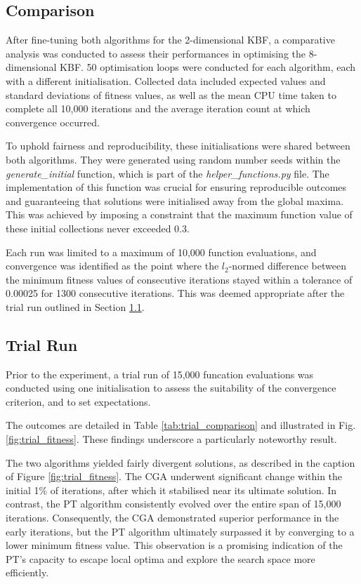 \documentclass[10pt]{article}
\begin{document}
\begin{multicols}{2}
\section{Comparison}
\label{sec:CGA_QEG_comparison}

After fine-tuning both algorithms for the 2-dimensional KBF, a comparative analysis was conducted to assess their performances in optimising the 8-dimensional KBF. 50 optimisation loops were conducted for each algorithm, each with a different initialisation.  Collected data included expected values and standard deviations of fitness values, as well as the mean CPU time taken to complete all 10,000 iterations and the average iteration count at which convergence occurred.

To uphold fairness and reproducibility, these initialisations were shared between both algorithms. They were generated using random number seeds within the \textit{generate\_initial} function, which is part of the \textit{helper\_functions.py} file. The implementation of this function was crucial for ensuring reproducible outcomes and guaranteeing that solutions were initialised away from the global maxima. This was achieved by imposing a constraint that the maximum function value of these initial collections never exceeded 0.3.

Each run was limited to a maximum of 10,000 function evaluations, and convergence was identified as the point where the $l_2$-normed difference between the minimum fitness values of consecutive iterations stayed within a tolerance of 0.00025 for 1300 consecutive iterations. This was deemed appropriate after the trial run outlined in Section \ref{sec:trial}.

\subsection{Trial Run}
\label{sec:trial}

Prior to the experiment, a trial run of 15,000 funcation evaluations was conducted using one initialisation to assess the suitability of the convergence criterion, and to set expectations.

The outcomes are detailed in Table \ref{tab:trial_comparison} and illustrated in Fig. \ref{fig:trial_fitness}. These findings underscore a particularly noteworthy result.

The two algorithms yielded fairly divergent solutions, as described in the caption of Figure \ref{fig:trial_fitness}. The CGA underwent significant change within the initial 1\% of iterations, after which it stabilised near its ultimate solution. In contrast, the PT algorithm consistently evolved over the entire span of 15,000 iterations. Consequently, the CGA demonstrated superior performance in the early iterations, but the PT algorithm ultimately surpassed it by converging to a lower minimum fitness value. This observation is a promising indication of the PT's capacity to escape local optima and explore the search space more efficiently.


\end{multicols}
\end{document}
